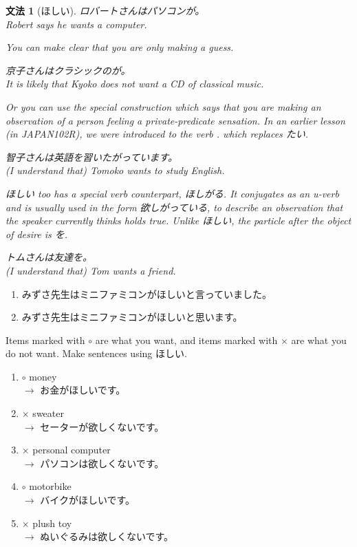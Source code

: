 \documentclass[notoc,notitlepage]{tufte-book}
\newtheorem{grammar}{文法}[section]
\begin{document}
\begin{grammar}[ほしい]
  ロバートさんはパソコンが。 \\
  Robert says he wants a computer.

  \noindent You can make clear that you are only making a guess.

  京子さんはクラシックのが。\\
  It is likely that Kyoko does not want a CD of classical music.

  \noindent Or you can use the special construction which says that you are making an observation of a person feeling a private-predicate sensation. In an earlier lesson (in JAPAN102R), we were introduced to the verb . which replaces たい.

  智子さんは英語を習いたがっています。\\
  (I understand that) Tomoko wants to study English.

  \noindent ほしい too has a special verb counterpart, ほしがる. It conjugates as an \textit{u}-verb and is usually used in the form 欲しがっている, to describe an observation that the speaker currently thinks holds true. Unlike ほしい, the particle after the object of desire is を.

  トムさんは友達を。\\
  (I understand that) Tom wants a friend.
\end{grammar}

\begin{eg}
  \begin{enumerate}
    \item みずさ先生はミニファミコンがほしいと言っていました。
    \item みずさ先生はミニファミコンがほしいと思います。
  \end{enumerate}
\end{eg}

\begin{ex}
  Items marked with $\circ$ are what you want, and items marked with $\times$ are what you do not want. Make sentences using ほしい.

  \begin{enumerate}
    \item $\circ$ money \\
      $\to$ お金がほしいです。
    \item $\times$ sweater \\
      $\to$ セーターが欲しくないです。
    \item $\times$ personal computer \\
      $\to$ パソコンは欲しくないです。
    \item $\circ$ motorbike \\
      $\to$ バイクがほしいです。
    \item $\times$ plush toy \\
      $\to$ ぬいぐるみは欲しくないです。
  \end{enumerate}
\end{ex}
\end{document}
